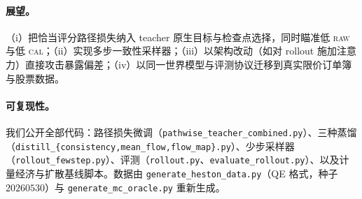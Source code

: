 \documentclass[11pt]{ctexart}
\newcommand{\raw}{\textsc{raw}}
\renewcommand{\cal}{\textsc{cal}}
\begin{document}
\paragraph{展望。}（i）把恰当评分路径损失纳入 teacher 原生目标与检查点选择，同时瞄准低 \raw{} 与低 \cal{}；（ii）实现多步一致性采样器；（iii）以架构改动（如对 rollout 施加注意力）直接攻击暴露偏差；（iv）以同一世界模型与评测协议迁移到真实限价订单簿与股票数据。

\paragraph{可复现性。}我们公开全部代码：路径损失微调（\texttt{pathwise\_teacher\_combined.py}）、三种蒸馏（\texttt{distill\_\{consistency,mean\_flow,flow\_map\}.py}）、少步采样器（\texttt{rollout\_fewstep.py}）、评测（\texttt{rollout.py}、\texttt{evaluate\_rollout.py}）、以及计量经济与扩散基线脚本。数据由 \texttt{generate\_heston\_data.py}（QE 格式，种子 $20260530$）与 \texttt{generate\_mc\_oracle.py} 重新生成。



\end{document}
